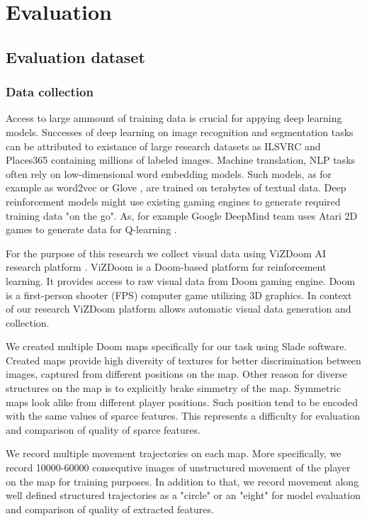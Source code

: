 
\chapter{Evaluation}
\label{ch:eval}

\section{Evaluation dataset}
\subsection{Data collection}

Access to large ammount of training data is crucial for appying deep learning models.
Successes of deep learning on image recognition and segmentation tasks can be attributed to existance of large research datasets as ILSVRC and Places365 \cite{ILSVRC15, Zhou2016} containing millions of labeled images.
Machine translation, NLP tasks \cite{Karpathy2014, Kim2014} often rely on low-dimensional word embedding models.
Such models, as for example as word2vec or Glove \cite{Mikolov2013, pennington2014glove}, are trained on terabytes of textual data.
Deep reinforcement models might use existing gaming engines to generate required training data "on the go".
As, for example Google DeepMind team uses Atari 2D games to generate data for Q-learning \cite{Mnih2013}.

For the purpose of this research we collect visual data using ViZDoom AI research platform \cite{Kempka2016}.
ViZDoom is a Doom-based platform for reinforcement learning.
It provides access to raw visual data from Doom gaming engine.
Doom is a first-person shooter (FPS) computer game utilizing 3D graphics.
In context of our research ViZDoom platform allows automatic visual data generation and collection.

We created multiple Doom maps specifically for our task using Slade \cite{Slade3} software.
Created maps provide high diversity of textures for better discrimination between images, captured from different positions on the map.
Other reason for diverse structures on the map is to explicitly brake simmetry of the map.
Symmetric maps look alike from different player positions.
Such position tend to be encoded with the same values of sparce features.
This represents a difficulty for evaluation and comparison of quality of sparce features.

We record multiple movement trajectories on each map.
More specifically, we record 10000-60000 consequtive images of unstructured movement of the player on the map for training purposes.
In addition to that, we record movement along well defined structured trajectories as a "circle" or an "eight" for model evaluation and comparison of quality of extracted features.


